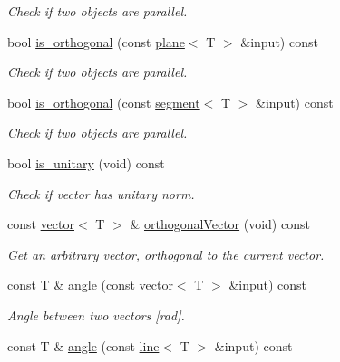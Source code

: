 \begin{DoxyCompactItemize}
\begin{DoxyCompactList}\small\item\em Check if two objects are parallel. \end{DoxyCompactList}\item 
bool \hyperlink{classddd_1_1vector_af38d308ceac7857d6ee34b585e738024}{is\+\_\+orthogonal} (const \hyperlink{classddd_1_1plane}{plane}$<$ T $>$ \&input) const
\begin{DoxyCompactList}\small\item\em Check if two objects are parallel. \end{DoxyCompactList}\item 
bool \hyperlink{classddd_1_1vector_aca9e60a6b4f44e5bf20400b47f4f23b7}{is\+\_\+orthogonal} (const \hyperlink{classddd_1_1segment}{segment}$<$ T $>$ \&input) const
\begin{DoxyCompactList}\small\item\em Check if two objects are parallel. \end{DoxyCompactList}\item 
\mbox{\label{classddd_1_1vector_a2fe8e8a3145f70a6f440cd636a13a7be}} 
bool \hyperlink{classddd_1_1vector_a2fe8e8a3145f70a6f440cd636a13a7be}{is\+\_\+unitary} (void) const
\begin{DoxyCompactList}\small\item\em Check if vector has unitary norm. \end{DoxyCompactList}\item 
\mbox{\label{classddd_1_1vector_a3ad5fe35a6b91b17a45af430a2622380}} 
const \hyperlink{classddd_1_1vector}{vector}$<$ T $>$ \& \hyperlink{classddd_1_1vector_a3ad5fe35a6b91b17a45af430a2622380}{orthogonal\+Vector} (void) const
\begin{DoxyCompactList}\small\item\em Get an arbitrary vector, orthogonal to the current vector. \end{DoxyCompactList}\item 
const T \& \hyperlink{classddd_1_1vector_ad1a37ce1d1c20c227257fd1fd223c3cf}{angle} (const \hyperlink{classddd_1_1vector}{vector}$<$ T $>$ \&input) const
\begin{DoxyCompactList}\small\item\em Angle between two vectors \mbox{[}rad\mbox{]}. \end{DoxyCompactList}\item 
const T \& \hyperlink{classddd_1_1vector_a97a1359914c22ea1e3928f02fc650bac}{angle} (const \hyperlink{classddd_1_1line}{line}$<$ T $>$ \&input) const

\end{DoxyCompactItemize}
